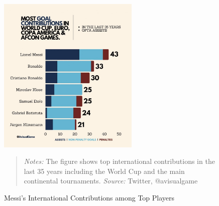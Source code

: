 \begin{figure}[ht!]
    \centering
    \includegraphics[width=0.6\textwidth]{chapter_two/graphics/international_contributions.jpg}
    \caption{Messi's International Contributions among Top Players}
    \label{fig:international_contributions}
    \begin{quote}
        \textit{Notes:} 
        The figure shows top international contributions in the 
        last 35 years including the World Cup and the main 
        continental tournaments.
        \textit{Source:} Twitter, @avisualgame 
    \end{quote} 
\end{figure}
